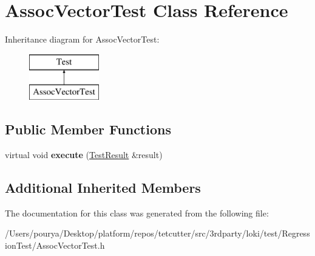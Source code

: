 \hypertarget{classAssocVectorTest}{}\section{Assoc\+Vector\+Test Class Reference}
\label{classAssocVectorTest}
Inheritance diagram for Assoc\+Vector\+Test\+:\begin{figure}[H]
\begin{center}
\leavevmode
\includegraphics[height=2.000000cm]{classAssocVectorTest}
\end{center}
\end{figure}
\subsection*{Public Member Functions}
\begin{DoxyCompactItemize}
\item 
\hypertarget{classAssocVectorTest_a95ab0467f6f7a6910570a2219cf51768}{}virtual void {\bfseries execute} (\hyperlink{classTestResult}{Test\+Result} \&result)\label{classAssocVectorTest_a95ab0467f6f7a6910570a2219cf51768}

\end{DoxyCompactItemize}
\subsection*{Additional Inherited Members}


The documentation for this class was generated from the following file\+:\begin{DoxyCompactItemize}
\item 
/\+Users/pourya/\+Desktop/platform/repos/tetcutter/src/3rdparty/loki/test/\+Regression\+Test/Assoc\+Vector\+Test.\+h\end{DoxyCompactItemize}
